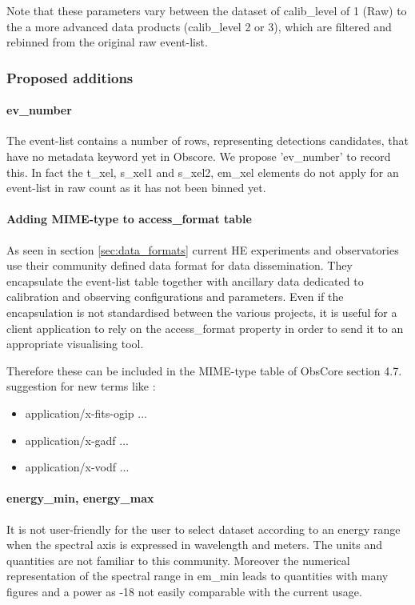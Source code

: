 \documentclass[11pt,a4paper]{ivoa}
\begin{document}
{Note that these parameters vary between the dataset of calib\_level of 1 (Raw) to the a more advanced data products (calib\_level 2 or 3), which are filtered and rebinned from the original raw event-list.


\subsubsection{Proposed additions}

\paragraph{ev\_number}
The event-list contains a number of rows, representing detections candidates, that have no metadata keyword yet in Obscore.
We propose 'ev\_number' to record this.
In fact the t\_xel, s\_xel1 and s\_xel2, em\_xel elements do not apply for an event-list in raw count as it has not been binned yet.

\paragraph{Adding MIME-type to access\_format table}
As seen in section \ref{sec:data_formats} current \gls{HE} experiments and observatories use their community defined data format for data dissemination.
They encapsulate the event-list table together with ancillary data dedicated to calibration and observing configurations and parameters.
Even if the encapsulation is not standardised between the various projects, it is useful for a client application to rely on the access\_format property in order to send it to an appropriate visualising tool.

Therefore these can be included in the MIME-type table of ObsCore section 4.7. suggestion for new terms like :
\begin{itemize}
\item application/x-fits-ogip ...
\item application/x-gadf  ...
\item application/x-vodf  ...
\end{itemize}


\paragraph{energy\_min, energy\_max}
It is not user-friendly for the user to select dataset according to an energy range when the spectral axis is expressed in wavelength and meters. The units and quantities are not familiar to this community.
Moreover the numerical representation of the spectral range in em\_min leads to quantities with many figures and a power as -18 not easily comparable with the current usage.

}
\end{document}
